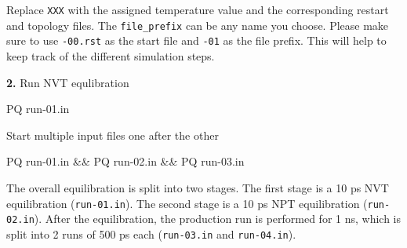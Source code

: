 \documentclass[
  letterpaper,
  DIV=11,
  numbers=noendperiod]{scrreprt}
\newenvironment{Shaded}{\begin{snugshade}}{\end{snugshade}}
\newcommand{\ExtensionTok}[1]{\textcolor[rgb]{0.00,0.23,0.31}{#1}}
\newcommand{\KeywordTok}[1]{\textcolor[rgb]{0.00,0.23,0.31}{#1}}
\newcommand{\NormalTok}[1]{\textcolor[rgb]{0.00,0.23,0.31}{#1}}
\begin{document}
\begin{tcolorbox}[enhanced jigsaw, title=\textcolor{quarto-callout-note-color}{\faInfo}\hspace{0.5em}{Note}, colbacktitle=quarto-callout-note-color!10!white, bottomtitle=1mm, breakable, colframe=quarto-callout-note-color-frame, toprule=.15mm, opacitybacktitle=0.6, bottomrule=.15mm, titlerule=0mm, arc=.35mm, rightrule=.15mm, toptitle=1mm, coltitle=black, left=2mm, opacityback=0, colback=white, leftrule=.75mm]

Replace \texttt{XXX} with the assigned temperature value and the
corresponding restart and topology files. The \texttt{file\_prefix} can
be any name you choose. Please make sure to use \texttt{-00.rst} as the
start file and \texttt{-01} as the file prefix. This will help to keep
track of the different simulation steps.

\end{tcolorbox}

\textbf{2.} Run NVT equlibration

\begin{Shaded}
\begin{Highlighting}[]
\ExtensionTok{PQ}\NormalTok{ run{-}01.in}
\end{Highlighting}
\end{Shaded}

Start multiple input files one after the other

\begin{Shaded}
\begin{Highlighting}[]
\ExtensionTok{PQ}\NormalTok{ run{-}01.in }\KeywordTok{\&\&} \ExtensionTok{PQ}\NormalTok{ run{-}02.in }\KeywordTok{\&\&} \ExtensionTok{PQ}\NormalTok{ run{-}03.in}
\end{Highlighting}
\end{Shaded}

\begin{tcolorbox}[enhanced jigsaw, title=\textcolor{quarto-callout-important-color}{\faExclamation}\hspace{0.5em}{Important}, colbacktitle=quarto-callout-important-color!10!white, bottomtitle=1mm, breakable, colframe=quarto-callout-important-color-frame, toprule=.15mm, opacitybacktitle=0.6, bottomrule=.15mm, titlerule=0mm, arc=.35mm, rightrule=.15mm, toptitle=1mm, coltitle=black, left=2mm, opacityback=0, colback=white, leftrule=.75mm]

The overall equilibration is split into two stages. The first stage is a
10 ps NVT equilibration (\texttt{run-01.in}). The second stage is a 10
ps NPT equilibration (\texttt{run-02.in}). After the equilibration, the
production run is performed for 1 ns, which is split into 2 runs of 500
ps each (\texttt{run-03.in} and \texttt{run-04.in}).

\end{tcolorbox}
\end{document}
